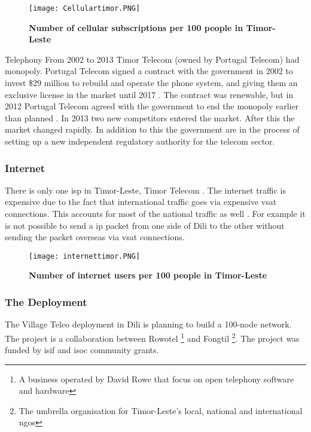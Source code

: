 \begin{figure}[H]
\centering
\texttt{[image: Cellulartimor.PNG]}
\caption[Number of cellular subscriptions per 100 people in Timor-Leste]{\textbf{Number of cellular subscriptions per 100 people in Timor-Leste}}
\label{fig:cellulartimor}
\end{figure}

{Telephony }
From 2002 to 2013 Timor Telecom (owned by Portugal Telecom) had monopoly. Portugal Telecom signed a contract with the government in 2002 to invest \$29 million to rebuild and operate the phone system, and giving them an exclusive license in the market until 2017 \cite{wikitelecomeasttimor}. The contract was renewable, but in 2012 Portugal Telecom agreed with the government to end the monopoly earlier than planned \cite{budde}. In 2013 two new competitors entered the market. After this the market changed rapidly. In addition to this the government are in the process of setting up a new independent regulatory authority for the telecom sector. 

\subsubsection{Internet} There is only one \gls{isp} in Timor-Leste, Timor Telecom \cite{wikitelecomeasttimor}. The internet traffic is expensive due to the fact that international traffic goes via expensive \gls{vsat} connections. This accounts for most of the national traffic as well \cite{vtdili}. For example it is not possible to send a \gls{ip} packet from one side of Dili to the other without sending the packet overseas via \gls{vsat} connections. 


\begin{figure}[H]
\centering
\texttt{[image: internettimor.PNG]}
\caption[Number of internet users per 100 people in Timor-Leste]{\textbf{Number of internet users per 100 people in Timor-Leste}}
\label{fig:internettimor}
\end{figure}

\subsubsection{The Deployment}
The Village Telco deployment in Dili is planning to build a 100-node network. The project is a collaboration between Rowotel \footnote{A business operated by David Rowe that focus on open telephony software and hardware} and Fongtil \footnote{The umbrella organisation for Timor-Leste’s local, national and international \glspl{ngo} }. The project was funded by \gls{isif} and \gls{isoc} community grants. 

